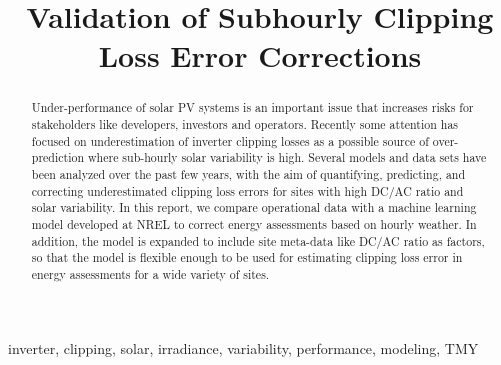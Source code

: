 \documentclass[conference]{IEEEtran}
\begin{document}
\title{Validation of Subhourly Clipping Loss Error Corrections}

\author{
    }

\maketitle

\begin{abstract}
Under-performance of solar PV systems is an important issue that increases risks for stakeholders like developers, investors and operators. Recently some attention has focused on underestimation of inverter clipping losses as a possible source of over-prediction where sub-hourly solar variability is high. Several models and data sets have been analyzed over the past few years, with the aim of quantifying, predicting, and correcting underestimated clipping loss errors for sites with high DC/AC ratio and solar variability. In this report, we compare operational data with a machine learning model developed at NREL to correct energy assessments based on hourly weather. In addition, the model is expanded to include site meta-data like DC/AC ratio as factors, so that the model is flexible enough to be used for estimating clipping loss error in energy assessments for a wide variety of sites. 
\end{abstract}

\begin{IEEEkeywords}
inverter, clipping, solar, irradiance, variability, performance, modeling, TMY
\end{IEEEkeywords}
\end{document}

